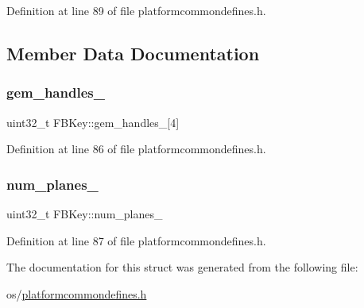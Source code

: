 Definition at line 89 of file platformcommondefines.\+h.


\begin{DoxyCode}{0}
\end{DoxyCode}


\subsection{Member Data Documentation}
\mbox{\label{structFBKey_af9c338051a21174ecb54479cf78116c8}} 
\subsubsection{\texorpdfstring{gem\+\_\+handles\+\_\+}{gem\_handles\_}}
{\footnotesize\ttfamily uint32\+\_\+t F\+B\+Key\+::gem\+\_\+handles\+\_\+\mbox{[}4\mbox{]}}



Definition at line 86 of file platformcommondefines.\+h.

\mbox{\label{structFBKey_a3d3bda0ee29a63ca3f9c676d23a472e3}} 
\subsubsection{\texorpdfstring{num\+\_\+planes\+\_\+}{num\_planes\_}}
{\footnotesize\ttfamily uint32\+\_\+t F\+B\+Key\+::num\+\_\+planes\+\_\+}



Definition at line 87 of file platformcommondefines.\+h.



The documentation for this struct was generated from the following file\+:\begin{DoxyCompactItemize}
\item 
os/\mbox{\hyperlink{platformcommondefines_8h}{platformcommondefines.\+h}}\end{DoxyCompactItemize}

